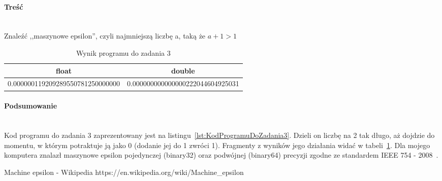 \paragraph{Treść}~\\
Znaleźć ,,maszynowe epsilon'', czyli najmniejszą liczbę a, taką że $ a + 1 > 1 $



\begin{table}[h]
  \caption{Wynik programu do zadania 3}
  \label{tab:WynikProgramuDoZadania3}
  \centering
  \begin{tabular}{c|c}
    float & double\\
    \hline 0.000000119209289550781250000000 & 0.000000000000000222044604925031\\
  \end{tabular}
\end{table}

\paragraph{Podsumowanie}~\\
Kod programu do zadania 3 zaprezentowany jest na listingu~\ref{lst:KodProgramuDoZadania3}.
Dzieli on liczbę na 2 tak długo, aż dojdzie do momentu, w którym potraktuje ją jako 0 (dodanie jej do 1 zwróci 1).
Fragmenty z wyników jego działania widać w tabeli~\ref{tab:WynikProgramuDoZadania3}.
Dla mojego komputera znalazł maszynowe epsilon pojedynczej (binary32) oraz podwójnej (binary64) precyzji zgodne ze standardem IEEE 754 - 2008~\cite{WikiMachineEpsilon}.

\begin{thebibliography}{9}
   Machine epsilon - Wikipedia https://en.wikipedia.org/wiki/Machine\_epsilon
\end{thebibliography}
